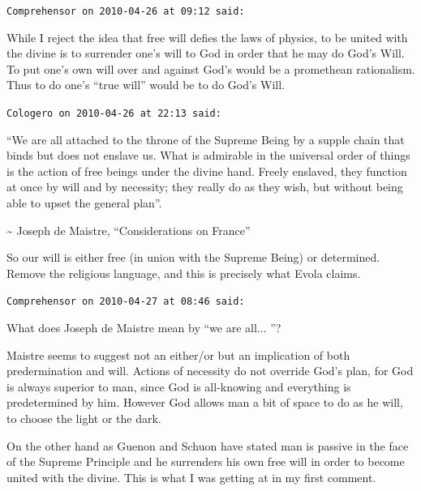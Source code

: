 \begin{footnotesize}
\begin{sffamily}
\texttt{Comprehensor on 2010-04-26 at 09:12 said:}

While I reject the idea that free will defies the laws of physics, to be united with the divine is to surrender one's will to God in order that he may do God's Will. To put one's own will over and against God's would be a promethean rationalism. Thus to do one's ``true will'' would be to do God's Will.

\hfill

\texttt{Cologero on 2010-04-26 at 22:13 said:}

``We are all attached to the throne of the Supreme Being by a supple chain that binds but does not enslave us. What is admirable in the universal order of things is the action of free beings under the divine hand. Freely enslaved, they function at once by will and by necessity; they really do as they wish, but without being able to upset the general plan''.

\textasciitilde{} Joseph de Maistre, ``Considerations on France''


So our will is either free (in union with the Supreme Being) or determined. Remove the religious language, and this is precisely what Evola claims.

\hfill

\texttt{Comprehensor on 2010-04-27 at 08:46 said:}

What does Joseph de Maistre mean by ``we are all... ''?

Maistre seems to suggest not an either/or but an implication of both predermination and will. Actions of necessity do not override God's plan, for God is always superior to man, since God is all-knowing and everything is predetermined by him. However God allows man a bit of space to do as he will, to choose the light or the dark.

On the other hand as Guenon and Schuon have stated man is passive in the face of the Supreme Principle and he surrenders his own free will in order to become united with the divine. This is what I was getting at in my first comment.

\end{sffamily}
\end{footnotesize}

